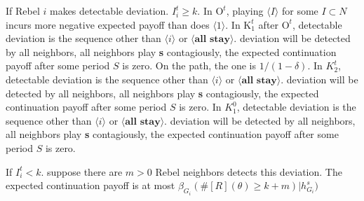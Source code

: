 \documentclass[12pt,letter]{article}
\newcommand{\Kappa}{\mathrm{K}}
\newcommand{\Omicron}{\mathrm{O}}
\theoremstyle{definition}
\theoremstyle{remark}
\theoremstyle{claim}
\begin{document}
If Rebel $i$ makes detectable deviation. $I^t_i\geq k$. In $\Omicron^t$, playing $\langle I \rangle$ for some $I\subset N$ incurs more negative expected payoff than does $\langle 1 \rangle$. In $\Kappa^t_{1}$ after $\Omicron^t$, detectable deviation is the sequence other than $\langle i \rangle$ or $\langle \textbf{all stay} \rangle$. deviation will be detected by all neighbors, all neighbors play \textbf{s} contagiously, the expected continuation payoff after some period $S$ is zero. On the path, the one is $1/(1-\delta)$. In $K^t_2$, detectable deviation is the sequence other than $\langle i \rangle$ or $\langle \textbf{all stay} \rangle$. deviation will be detected by all neighbors, all neighbors play \textbf{s} contagiously, the expected continuation payoff after some period $S$ is zero. In $K^0_1$, detectable deviation is the sequence other than $\langle i \rangle$ or $\langle \textbf{all stay} \rangle$. deviation will be detected by all neighbors, all neighbors play \textbf{s} contagiously, the expected continuation payoff after some period $S$ is zero.

If $I^t_i<k$. suppose there are $m>0$ Rebel neighbors detects this deviation. The expected continuation payoff is at most $\beta_{G_i}(\#[R](\theta)\geq k+m)|h^s_{G_i})$ 
\end{document}
